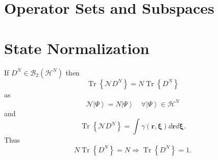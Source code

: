\documentclass[aps,preprint]{revtex4}%
\begin{document}
\bigskip

\section{Operator Sets and Subspaces \label{Operators}}

\bigskip

\section{State Normalization \label{Normalization}}

If $D^{N}\in\mathcal{B}_{2}\left(  \mathcal{H}^{N}\right)  $ then
\begin{equation}
\operatorname{Tr}\left\{  \mathcal{N}D^{N}\right\}  =N\operatorname{Tr}%
\left\{  D^{N}\right\}
\end{equation}
as
\begin{equation}
\mathcal{N}\left\vert \Psi\right\rangle =N\left\vert \Psi\right\rangle
\quad\forall\left\vert \Psi\right\rangle \in\mathcal{H}^{N}%
\end{equation}
and
\begin{equation}
\operatorname{Tr}\left\{  \mathcal{N}D^{N}\right\}  =\int\gamma\left(
\mathbf{r,\xi}\right)  d\mathbf{r}d\mathbf{\xi.}%
\end{equation}
Thus
\begin{equation}
N\operatorname{Tr}\left\{  D^{N}\right\}  =N\Rightarrow\operatorname{Tr}%
\left\{  D^{N}\right\}  =1.
\end{equation}
\end{document}
